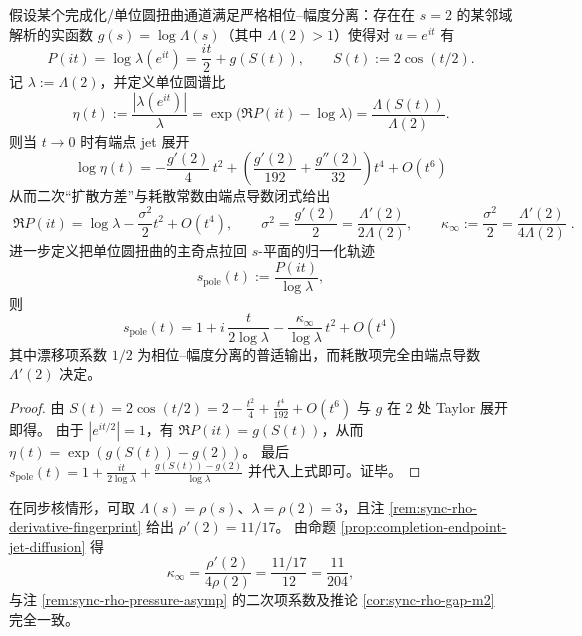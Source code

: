 \begin{proposition}\label{prop:completion-endpoint-jet-diffusion}
假设某个完成化/单位圆扭曲通道满足严格相位--幅度分离：存在在 \(s=2\) 的某邻域解析的实函数 \(g(s)=\log\Lambda(s)\)（其中 \(\Lambda(2)>1\)）使得对 \(u=e^{it}\) 有
\[
P(it)=\log\lambda(e^{it})=\frac{it}{2}+g\!\left(S(t)\right),
\qquad
S(t):=2\cos(t/2).
\]
记 \(\lambda:=\Lambda(2)\)，并定义单位圆谱比
\[
\eta(t):=\frac{|\lambda(e^{it})|}{\lambda}
=\exp\!\bigl(\Re P(it)-\log\lambda\bigr)
=\frac{\Lambda(S(t))}{\Lambda(2)}.
\]
则当 \(t\to 0\) 时有端点 jet 展开
\[
\boxed{\;
\log\eta(t)
=-\frac{g'(2)}{4}\,t^{2}
+\left(\frac{g'(2)}{192}+\frac{g''(2)}{32}\right)t^{4}
+O(t^{6})\;}
\]
从而二次“扩散方差”与耗散常数由端点导数闭式给出
\[
\boxed{\;
\Re P(it)=\log\lambda-\frac{\sigma^{2}}{2}t^{2}+O(t^{4}),\qquad
\sigma^{2}=\frac{g'(2)}{2}=\frac{\Lambda'(2)}{2\Lambda(2)},\qquad
\kappa_\infty:=\frac{\sigma^{2}}{2}=\frac{\Lambda'(2)}{4\Lambda(2)}\; }.
\]
进一步定义把单位圆扭曲的主奇点拉回 \(s\)-平面的归一化轨迹
\[
s_{\mathrm{pole}}(t):=\frac{P(it)}{\log\lambda},
\]
则
\[
\boxed{\;
s_{\mathrm{pole}}(t)
=1+i\,\frac{t}{2\log\lambda}-\frac{\kappa_\infty}{\log\lambda}\,t^{2}+O(t^{4})\;}
\]
其中漂移项系数 \(1/2\) 为相位--幅度分离的普适输出，而耗散项完全由端点导数 \(\Lambda'(2)\) 决定。
\end{proposition}
\begin{proof}
由 \(S(t)=2\cos(t/2)=2-\frac{t^{2}}{4}+\frac{t^{4}}{192}+O(t^{6})\) 与 \(g\) 在 \(2\) 处 Taylor 展开即得。
由于 \(|e^{it/2}|=1\)，有 \(\Re P(it)=g(S(t))\)，从而 \(\eta(t)=\exp(g(S(t))-g(2))\)。
最后 \(s_{\mathrm{pole}}(t)=1+\frac{it}{2\log\lambda}+\frac{g(S(t))-g(2)}{\log\lambda}\) 并代入上式即可。证毕。
\end{proof}

\begin{remark}\label{rem:sync-endpoint-diffusion-check}
在同步核情形，可取 \(\Lambda(s)=\rho(s)\)、\(\lambda=\rho(2)=3\)，且注 \ref{rem:sync-rho-derivative-fingerprint} 给出 \(\rho'(2)=11/17\)。
由命题 \ref{prop:completion-endpoint-jet-diffusion} 得
\[
\kappa_\infty=\frac{\rho'(2)}{4\rho(2)}=\frac{11/17}{12}=\frac{11}{204},
\]
与注 \ref{rem:sync-rho-pressure-asymp} 的二次项系数及推论 \ref{cor:sync-rho-gap-m2} 完全一致。
\end{remark}

